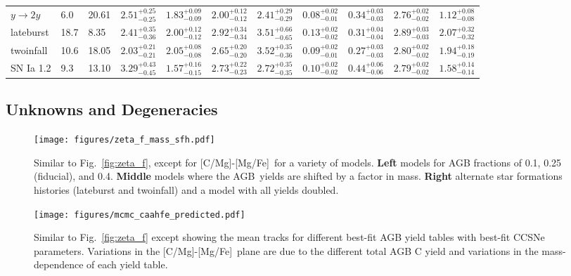 \documentclass[fleqn,
usenatbib]{mnras}
\newcommand{\agb}{AGB}
\newcommand{\caafe}{[C/Mg]-[Mg/Fe]}
\begin{document}
\begin{table}
{\begin{tabular}{l l l l l l l l l l l}
$y\rightarrow 2y$ &      6.0 &    20.61 & $2.51^{+0.25}_{-0.25}$  &  $1.83^{+0.09}_{-0.09}$  &  $2.00^{+0.12}_{-0.12}$  &  $2.41^{+0.29}_{-0.29}$  &  $0.08^{+0.02}_{-0.01}$  &  $0.34^{+0.03}_{-0.03}$  &  $2.76^{+0.02}_{-0.02}$  &  $1.12^{+0.08}_{-0.08}$\\ 
lateburst        &     18.7 &     8.35 & $2.41^{+0.35}_{-0.36}$  &  $2.00^{+0.12}_{-0.12}$  &  $2.92^{+0.34}_{-0.34}$  &  $3.51^{+0.66}_{-0.65}$  &  $0.13^{+0.02}_{-0.02}$  &  $0.31^{+0.04}_{-0.04}$  &  $2.89^{+0.03}_{-0.03}$  &  $2.07^{+0.32}_{-0.32}$\\ 
twoinfall        &     10.6 &    18.05 & $2.03^{+0.21}_{-0.21}$  &  $2.05^{+0.08}_{-0.08}$  &  $2.65^{+0.20}_{-0.20}$  &  $3.52^{+0.35}_{-0.36}$  &  $0.09^{+0.02}_{-0.01}$  &  $0.27^{+0.03}_{-0.03}$  &  $2.80^{+0.02}_{-0.02}$  &  $1.94^{+0.18}_{-0.19}$\\ 
SN Ia 1.2        &      9.3 &    13.10 & $3.29^{+0.43}_{-0.45}$  &  $1.57^{+0.16}_{-0.15}$  &  $2.73^{+0.22}_{-0.23}$  &  $2.72^{+0.35}_{-0.35}$  &  $0.10^{+0.02}_{-0.02}$  &  $0.44^{+0.06}_{-0.06}$  &  $2.79^{+0.02}_{-0.02}$  &  $1.58^{+0.14}_{-0.14}$\\ 

\hline
    \end{tabular}

}
    
\end{table}


\subsection{Unknowns and Degeneracies} \label{sec:sfh} \label{sec:outflows}
\label{sec:degeneracies}

\begin{figure}
    \texttt{[image: figures/zeta\_f\_mass\_sfh.pdf]}
    
    \caption[]{
        Similar to Fig.~\ref{fig:zeta_f}, except for \caafe\ for a variety of models.
        {\bf Left} models for AGB fractions of 0.1, 0.25 (fiducial), and 0.4. 
        {\bf Middle} models where the \agb\ yields are shifted by a factor in mass.
        {\bf Right} alternate star formations histories (lateburst and twoinfall) and a model with all yields doubled.
    }
    \label{fig:sims_degens}
\end{figure}

\begin{figure}
    \texttt{[image: figures/mcmc\_caahfe\_predicted.pdf]}

    \caption[]{
        Similar to Fig.~\ref{fig:zeta_f} except showing the mean tracks for different best-fit AGB yield tables with best-fit CCSNe parameters. Variations in the \caafe\ plane are due to the different total AGB C yield and variations in the mass-dependence of each yield table.
    }
    \label{fig:agb_predictions}
\end{figure}
\end{document}
